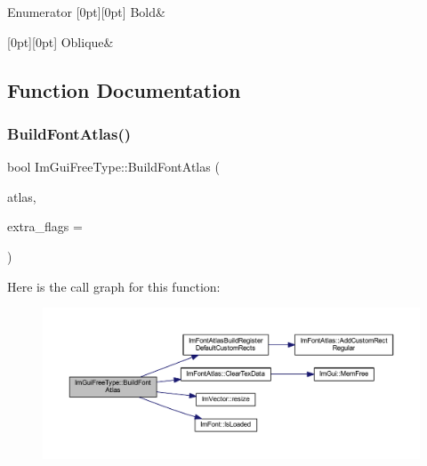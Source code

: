 \begin{DoxyEnumFields}{Enumerator}
[0pt][0pt]{}\mbox{\label{namespace_im_gui_free_type_a2f8e91ffa41706b44072258dcff5696fac371423e8763e294ce6c16f4bdb9e878}} 
Bold&\\
\hline

[0pt][0pt]{}\mbox{\label{namespace_im_gui_free_type_a2f8e91ffa41706b44072258dcff5696fa47d65041189aa56535c93e54745868af}} 
Oblique&\\
\hline

\end{DoxyEnumFields}


\subsection{Function Documentation}
\mbox{\label{namespace_im_gui_free_type_acb5c34ce2486d90e3afe7944664cc677}} 
\subsubsection{\texorpdfstring{Build\+Font\+Atlas()}{BuildFontAtlas()}}
{\footnotesize\ttfamily bool Im\+Gui\+Free\+Type\+::\+Build\+Font\+Atlas (\begin{DoxyParamCaption}\item[{\mbox{\hyperlink{struct_im_font_atlas}{Im\+Font\+Atlas}} $\ast$}]{atlas,  }\item[{unsigned int}]{extra\+\_\+flags = {} }\end{DoxyParamCaption})}

Here is the call graph for this function\+:
\nopagebreak
\begin{figure}[H]
\begin{center}
\leavevmode
\includegraphics[width=350pt]{namespace_im_gui_free_type_acb5c34ce2486d90e3afe7944664cc677_cgraph}
\end{center}
\end{figure}
